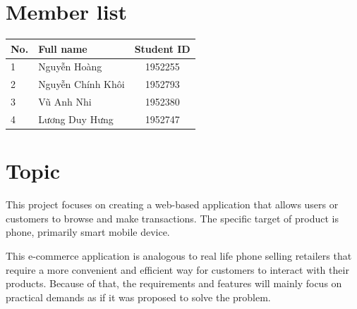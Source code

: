 \documentclass[a4paper]{article}
\numberwithin{equation}{section}
\begin{document}
\tableofcontents
\newpage

\section*{Member list}
\begin{center}
  \begin{tabular}{llc}
    \toprule
    \textbf{No.} & \textbf{Full name} & \textbf{Student ID} \\
    \midrule
    1            & Nguyễn Hoàng       & 1952255             \\
    2            & Nguyễn Chính Khôi  & 1952793             \\
    3            & Vũ Anh Nhi         & 1952380             \\
    4            & Lương Duy Hưng     & 1952747             \\
    \bottomrule
  \end{tabular}
\end{center}

\newpage

\section{Topic}
This project focuses on creating a web-based application that allows users or customers to browse and make transactions.
The specific target of product is phone, primarily smart mobile device.

This e-commerce application is analogous to real life phone selling retailers that require a more convenient and efficient way for customers to interact with their products.
Because of that, the requirements and features will mainly focus on practical demands as if it was proposed to solve the problem.
\end{document}
